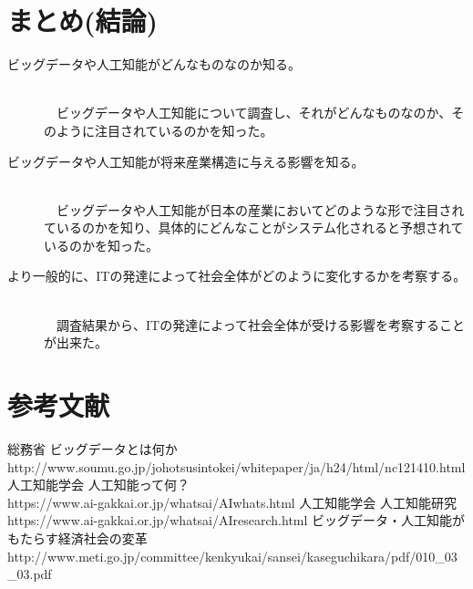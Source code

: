 \documentclass[a4paper,12pt]{jarticle}
\begin{document}
\section{まとめ(結論)}
\begin{description}
 \item[ビッグデータや人工知能がどんなものなのか知る。]\mbox\\\\
　ビッグデータや人工知能について調査し、それがどんなものなのか、そのように注目されているのかを知った。
 \item[ビッグデータや人工知能が将来産業構造に与える影響を知る。]\mbox\\\\
　ビッグデータや人工知能が日本の産業においてどのような形で注目されているのかを知り、具体的にどんなことがシステム化されると予想されているのかを知った。
 \item[より一般的に、ITの発達によって社会全体がどのように変化するかを考察する。]\mbox\\\\
　調査結果から、ITの発達によって社会全体が受ける影響を考察することが出来た。 
\end{description}
\section{参考文献}
\begin{thebibliography}{99}
  総務省 ビッグデータとは何か\\
http://www.soumu.go.jp/johotsusintokei/whitepaper/ja/h24/html/nc121410.html
  人工知能学会 人工知能って何？\\
https://www.ai-gakkai.or.jp/whatsai/AIwhats.html
  人工知能学会 人工知能研究\\
https://www.ai-gakkai.or.jp/whatsai/AIresearch.html
  ビッグデータ・人工知能がもたらす経済社会の変革\\
http://www.meti.go.jp/committee/kenkyukai/sansei/kaseguchikara/pdf/010\_03\_03.pdf
\end{thebibliography}
\end{document}
